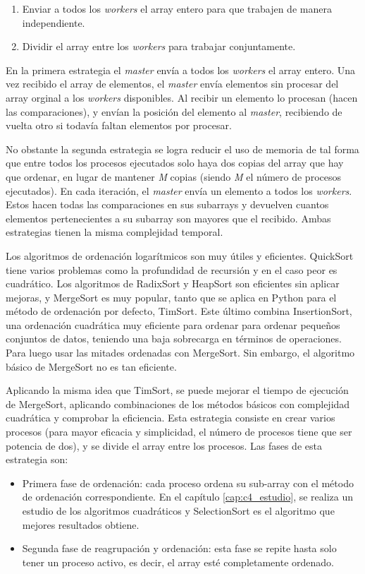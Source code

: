 	\begin{enumerate}
		\item Enviar a todos los \textit{workers} el array entero para que trabajen de manera independiente.
		\item Dividir el array entre los \textit{workers} para trabajar conjuntamente.
	\end{enumerate}
	
	En la primera estrategia el \textit{master} envía a todos los \textit{workers} el array entero. Una vez recibido el array de elementos, el \textit{master} envía elementos sin procesar del array orginal a los \textit{workers} disponibles. Al recibir un elemento lo procesan (hacen las comparaciones), y envían la posición del elemento al \textit{master}, recibiendo de vuelta otro si todavía faltan elementos por procesar. 
	
	No obstante la segunda estrategia se logra reducir el uso de memoria de tal forma que entre todos los procesos ejecutados solo haya dos copias del array que hay que ordenar, en lugar de mantener \textit{M} copias (siendo \textit{M} el número de procesos ejecutados). En cada iteración, el \textit{master} envía un elemento a todos los \textit{workers}. Estos hacen todas las comparaciones en sus subarrays y devuelven cuantos elementos pertenecientes a su subarray son mayores que el recibido. Ambas estrategias tienen la misma complejidad temporal.



	Los algoritmos de ordenación logarítmicos son muy útiles y eficientes. QuickSort tiene varios problemas como la profundidad de recursión y en el caso peor es cuadrático. Los algoritmos de RadixSort y HeapSort son eficientes sin aplicar mejoras, y MergeSort es muy popular, tanto que se aplica en Python para el método de ordenación por defecto, TimSort\cite{auger2015merge}. Este último combina InsertionSort, una ordenación cuadrática muy eficiente para ordenar para ordenar pequeños conjuntos de datos, teniendo una baja sobrecarga en términos de operaciones. Para luego usar las mitades ordenadas con MergeSort. Sin embargo, el algoritmo básico de MergeSort no es tan eficiente.
	
	Aplicando la misma idea que TimSort, se puede mejorar el tiempo de ejecución de MergeSort, aplicando combinaciones de los métodos básicos con complejidad cuadrática y comprobar la eficiencia. Esta estrategia consiste en crear varios procesos (para mayor eficacia y simplicidad, el número de procesos tiene que ser potencia de dos), y se divide el array entre los procesos. Las fases de esta estrategia son:
	\begin{itemize}
		\item Primera fase de ordenación: cada proceso ordena su sub-array con el método de ordenación correspondiente. En el capítulo \ref{cap:c4_estudio}, se realiza un estudio de los algoritmos cuadráticos y SelectionSort es el algoritmo que mejores resultados obtiene.
		\item Segunda fase de reagrupación y ordenación: esta fase se repite hasta solo tener un proceso activo, es decir, el array esté completamente ordenado.
	\end{itemize}
	
